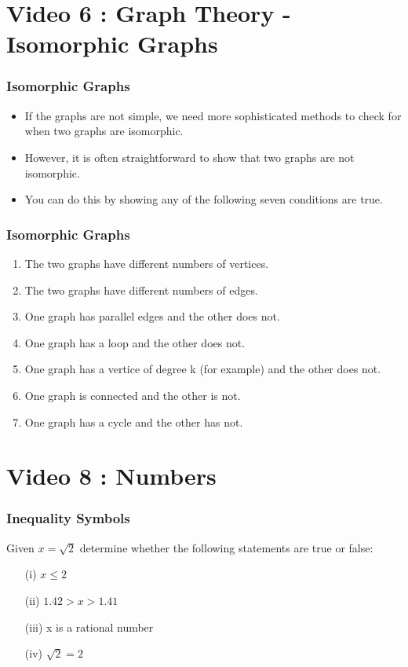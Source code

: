 \documentclass{beamer}
\begin{document}
\section{Video 6 : Graph Theory - Isomorphic Graphs}
\begin{frame}[fragile]
\frametitle{Isomorphic Graphs}
\begin{itemize}
\item If the graphs are not simple, we need more sophisticated methods to check for when two graphs are isomorphic. 
\item However, it is often straightforward to show that two graphs are not isomorphic. 
\item You can do this by showing any of the following seven conditions are true.
\end{itemize}
\end{frame}
\begin{frame}[fragile]
\frametitle{Isomorphic Graphs}

\begin{enumerate}
\item The two graphs have different numbers of vertices.
\item The two graphs have different numbers of edges.
\item One graph has parallel edges and the other does not.
\item One graph has a loop and the other does not.
\item One graph has a vertice of degree k (for example) and the other does not.
\item One graph is connected and the other is not.
\item One graph has a cycle and the other has not.
\end{enumerate}
\end{frame}

\section{Video 8 : Numbers}
\begin{frame}
\frametitle{Inequality Symbols}
\Large
Given $x = \sqrt{2}$ determine whether the following statements are true or false:

\begin{itemize}
\item[(i)] $x \leq 2$
\item[(ii)] $1.42 > x > 1.41$
\item[(iii)] x is a rational number
\item[(iv)] $\sqrt{2} = 2$
\end{itemize}
\end{frame}
\end{document}
